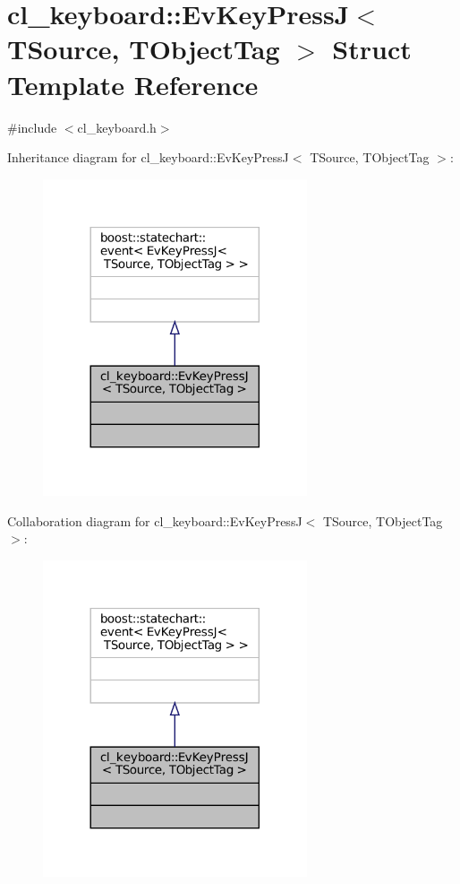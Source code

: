 \hypertarget{structcl__keyboard_1_1EvKeyPressJ}{}\section{cl\+\_\+keyboard\+:\+:Ev\+Key\+PressJ$<$ T\+Source, T\+Object\+Tag $>$ Struct Template Reference}
\label{structcl__keyboard_1_1EvKeyPressJ}


{\ttfamily \#include $<$cl\+\_\+keyboard.\+h$>$}



Inheritance diagram for cl\+\_\+keyboard\+:\+:Ev\+Key\+PressJ$<$ T\+Source, T\+Object\+Tag $>$\+:
\nopagebreak
\begin{figure}[H]
\begin{center}
\leavevmode
\includegraphics[width=221pt]{structcl__keyboard_1_1EvKeyPressJ__inherit__graph}
\end{center}
\end{figure}


Collaboration diagram for cl\+\_\+keyboard\+:\+:Ev\+Key\+PressJ$<$ T\+Source, T\+Object\+Tag $>$\+:
\nopagebreak
\begin{figure}[H]
\begin{center}
\leavevmode
\includegraphics[width=221pt]{structcl__keyboard_1_1EvKeyPressJ__coll__graph}
\end{center}
\end{figure}


